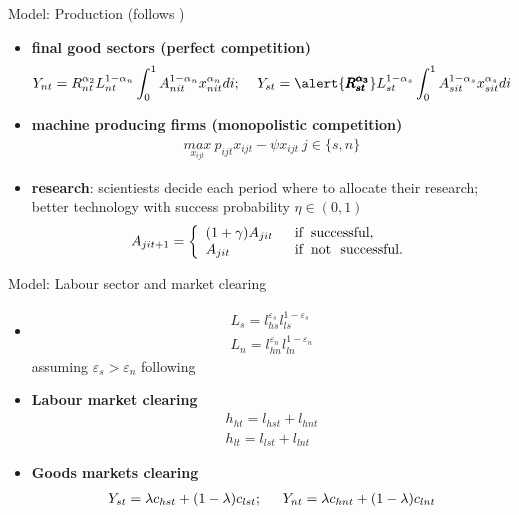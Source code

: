 \documentclass[11pt,aspectratio=169]{beamer}
\begin{document}
\begin{frame}{Model: Production
\tiny{(follows \cite{Acemoglu2012TheChange})}}
\begin{itemize}
	\item \textbf{final good sectors (perfect competition)}
	 \begin{align*}
	 &Y_{nt}=R_{nt}^{\alpha_{2}} L_{nt}^{1-\alpha_n}\int_{0}^{1}A_{nit}^{1-\alpha_n}x_{nit}^{\alpha_n} di; \ 
	 &Y_{st}=\alert{\pmb{R_{st}^{\alpha_{3}}}} L_{st}^{1-\alpha_s}\int_{0}^{1}A_{sit}^{1-\alpha_s}x_{sit}^{\alpha_s} di
	 \end{align*}
	\item \textbf{machine producing firms (monopolistic competition)}
	\begin{align*}
	\underset{x_{ijt}}{max}\  p_{ijt}x_{ijt}-\psi x_{ijt} \ j\in\{s,n\}
	\end{align*}

	\item \textbf{research}: scientiests decide each period where to allocate their research; better technology with success probability $\eta\in(0,1)$
\begin{align*}
A_{jit+1}=\left\{
\begin{array}{ll}
(1+\gamma)A_{jit}& \hspace{2mm} \text{if} \hspace*{2mm}\text{successful},\\
A_{jit}  &\hspace{2mm}\text{if}\hspace{2mm} \text{not \ successful}.
\end{array}
\right.
\end{align*}
\end{itemize}
\end{frame}

\begin{frame}{Model: Labour sector and market clearing}
	\begin{itemize}
\item \alert{}
\begin{align*}
L_s= l_{hs}^{\varepsilon_s}l_{ls}^{1-\varepsilon_s}\\
L_n=l_{hn}^{\varepsilon_n}l_{ln}^{1-\varepsilon_n}
\end{align*}
assuming $\varepsilon_s>\varepsilon_n$ following \cite{Consoli2016DoCapital}
\item \textbf{Labour market clearing}
\begin{align*}
 h_{ht}= l_{hst}+l_{hnt} \\
  h_{lt}= l_{lst}+l_{lnt}
\end{align*}
\item \textbf{Goods markets clearing}
\begin{align*}
Y_{st}=\lambda c_{hst}+(1-\lambda)c_{lst}; \  \hspace{4mm}
Y_{nt}=\lambda c_{hnt}+(1-\lambda)c_{lnt}
\end{align*}
	\end{itemize}
\end{frame}
\end{document}
